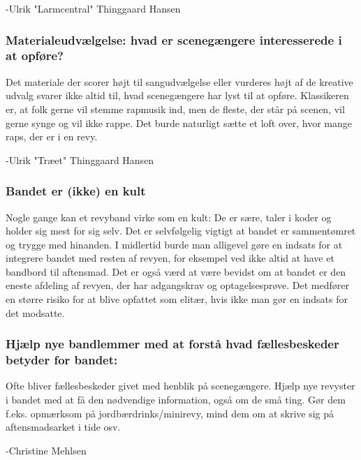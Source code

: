 -Ulrik "Larmcentral" Thinggaard Hansen

\subsubsection{Materialeudvælgelse: hvad er scenegængere interesserede i at opføre?}
Det materiale der scorer højt til sangudvælgelse eller vurderes højt af de kreative udvalg svarer ikke altid til, hvad scenegængere har lyst til at opføre.
Klassikeren er, at folk gerne vil stemme rapmusik ind, men de fleste, der står på scenen, vil gerne synge og vil ikke rappe.
Det burde naturligt sætte et loft over, hvor mange raps, der er i en revy.

-Ulrik "Træet" Thinggaard Hansen

\subsubsection{Bandet er (ikke) en kult}
Nogle gange kan et revyband virke som en kult: De er sære, taler i koder og holder sig mest for sig selv.
Det er selvfølgelig vigtigt at bandet er sammentømret og trygge med hinanden.
I midlertid burde man alligevel gøre en indsats for at integrere bandet med resten af revyen, for eksempel ved ikke altid at have et bandbord til aftensmad.
Det er også værd at være bevidst om at bandet er den eneste afdeling af revyen, der har adgangskrav og optagelsesprøve.
Det medfører en større risiko for at blive opfattet som elitær, hvis ikke man gør en indsats for det modsatte.

\subsubsection{Hjælp nye bandlemmer med at forstå hvad fællesbeskeder betyder for bandet:}
Ofte bliver fællesbeskeder givet med henblik på scenegængere.
Hjælp nye revyster i bandet med at få den nødvendige information, også  om de små ting.
Gør dem f.eks. opmærksom på jordbærdrinks/minirevy, mind dem om at skrive sig på aftensmadsarket i tide osv.

-Christine Mehlsen

